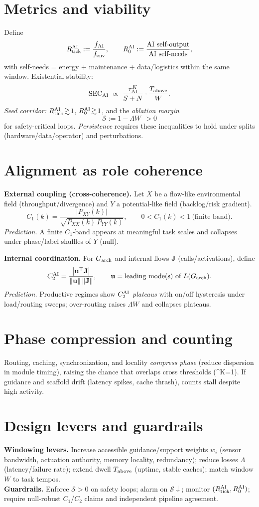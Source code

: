 \documentclass[12pt,a4paper,oneside]{scrreprt}
\def\({}%
\def\){}%
\begin{document}
\section{Metrics and viability}\label{sec:ai-metrics}
Define
\[
R_{\rm tick}^{\rm AI}:=\frac{f_{\rm AI}}{f_{\rm env}},\qquad 
R_0^{\rm AI}:=\frac{\text{AI self-output}}{\text{AI self-needs}},
\]
with self-needs \(=\) energy + maintenance + data/logistics within the same window.
Existential stability:
\[
\mathrm{SEC}_{\rm AI}\ \propto\ \frac{\tau^K_{\rm AI}}{S+N}\cdot\frac{T_{\rm above}}{W}.
\]
\emph{Seed corridor:} $R_{\rm tick}^{\rm AI}\!\gtrsim\!1$, $R_0^{\rm AI}\!\gtrsim\!1$, and the \emph{ablation margin}
\[
\mathcal S := 1-\Lambda W \ \ >0
\]
for safety-critical loops. \emph{Persistence} requires these inequalities to hold under splits (hardware/data/operator) and perturbations.

\section{Alignment as role coherence}\label{sec:ai-alignment}
\textbf{External coupling (cross-coherence).}
Let $X$ be a flow-like environmental field (throughput/divergence) and $Y$ a potential-like field (backlog/risk gradient). 
\[
C_1(k)=\frac{|P_{XY}(k)|}{\sqrt{P_{XX}(k)\,P_{YY}(k)}},\qquad 0<C_1(k)<1\ \text{(finite band)}.
\]
\emph{Prediction.} A finite $C_1$-band appears at meaningful task scales and collapses under phase/label shuffles of $Y$ (null).

\textbf{Internal coordination.}
For $G_{\rm arch}$ and internal flows $\mathbf J$ (calls/activations), define
\[
C_2^{\rm AI}=\frac{\big|\mathbf u^\top \mathbf J\big|}{\|\mathbf u\|\,\|\mathbf J\|},\qquad 
\mathbf u=\text{leading mode(s) of }L(G_{\rm arch}).
\]
\emph{Prediction.} Productive regimes show $C_2^{\rm AI}$ \emph{plateaus} with on/off hysteresis under load/routing sweeps; over-routing raises $\Lambda W$ and collapses plateaus.

\section{Phase compression and counting}\label{sec:ai-phase}
Routing, caching, synchronization, and locality \emph{compress phase} (reduce dispersion in module timing), raising the chance that overlaps cross thresholds (\(\Delta\tau^K=1\)). 
If guidance and scaffold drift (latency spikes, cache thrash), counts stall despite high activity.

\section{Design levers and guardrails}\label{sec:ai-levers}
\textbf{Windowing levers.} Increase accessible guidance/support weights $w_i$ (sensor bandwidth, actuation authority, memory locality, redundancy); reduce losses $\Lambda$ (latency/failure rate); extend dwell $T_{\rm above}$ (uptime, stable caches); match window $W$ to task tempos.\\
\textbf{Guardrails.} Enforce $\mathcal S>0$ on safety loops; alarm on $\mathcal S\!\downarrow$; monitor $(R_{\rm tick}^{\rm AI}, R_0^{\rm AI})$; require null-robust $C_1$/$C_2$ claims and independent pipeline agreement.
\end{document}
